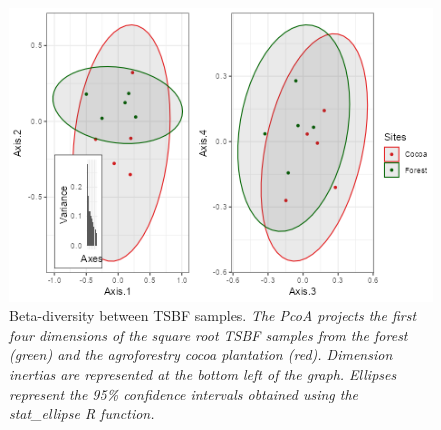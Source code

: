 \documentclass[fleqn,10pt]{ArtEcoFoG} %
\begin{document}
\normalsize

\scriptsize

\begin{figure}

{\centering \includegraphics[width=0.8\linewidth,]{rapport_files/figure-latex/betadiv-1} 

}

\caption{Beta-diversity between TSBF samples. \textit{ The PcoA projects the first four dimensions of the square root TSBF samples from the forest (green) and the agroforestry cocoa plantation (red). Dimension inertias are represented at the bottom left of the graph. Ellipses represent the 95\% confidence intervals obtained using the stat_ellipse R function.}}\label{fig:betadiv}
\end{figure}

\normalsize



\makeatletter

\makeatother


\end{document}

